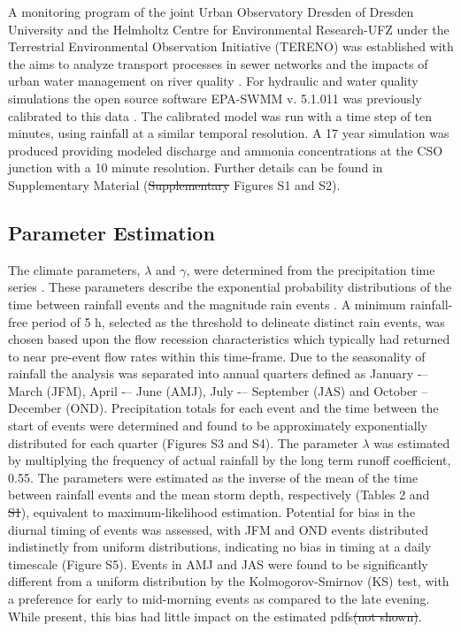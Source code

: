 \documentclass[draft,linenumbers]{agujournal2018}
\providecommand{\DIFadd}[1]{{\protect\color{blue}\uwave{#1}}} %
\providecommand{\DIFdel}[1]{{\protect\color{red}\sout{#1}}}                      %
\providecommand{\DIFaddbegin}{} %
\providecommand{\DIFaddend}{} %
\providecommand{\DIFdelbegin}{} %
\providecommand{\DIFdelend}{} %
\begin{document}
A monitoring program of the joint Urban Observatory Dresden of Dresden University and the Helmholtz Centre for Environmental Research-UFZ under the Terrestrial Environmental Observation Initiative (TERENO) was established with the aims to analyze transport processes in sewer networks and the impacts of urban water management on river quality \DIFdelbegin %
\DIFdelend \DIFaddbegin \citep{Helm2015, Wollschl_ger_2016}\DIFaddend . For hydraulic and water quality simulations the open source software EPA-SWMM v. 5.1.011 was previously calibrated to this data \DIFdelbegin %
\DIFdelend \DIFaddbegin \citep{Deb_2002,Kaeseberg_2018,Rossmann2010,steinberg2015}\DIFaddend . The calibrated model was run with a time step of ten minutes, using rainfall at a similar temporal resolution. A 17 year simulation was produced providing modeled discharge and ammonia concentrations at the CSO junction with a 10 minute resolution. Further details can be found in Supplementary Material (\DIFdelbegin \DIFdel{Supplementary }\DIFdelend \DIFaddbegin \DIFadd{Text S2, }\DIFaddend Figures S1 and S2).

\subsection{Parameter Estimation}
The climate parameters, $\lambda$ and $\gamma$, were determined from the precipitation time series \DIFaddbegin \DIFadd{(Supplementary Text S2, Table S2, Figures S3 - S5)}\DIFaddend . These parameters describe the exponential probability distributions of the time between rainfall events and the magnitude rain events \citep{Rodriguez_Iturbe_1999}. A minimum rainfall-free period of 5 h, selected as the threshold to delineate distinct rain events, was chosen based upon the f\/low recession characteristics which typically had returned to near pre-event f\/low rates within this time-frame. Due to the seasonality of rainfall the analysis was separated into annual quarters def\/ined as January -– March (JFM), April -– June (AMJ), July -– September (JAS) and October -- December (OND). Precipitation totals for each event and the time between the start of events were determined and found to be approximately exponentially distributed for each quarter (Figures S3 and S4). The parameter $\lambda$ was estimated by multiplying the frequency of actual rainfall by the long term runof\/f coef\/f\/icient, 0.55. The parameters were estimated as the inverse of the mean of the time between rainfall events and the mean storm depth, respectively (Tables 2 and \DIFdelbegin \DIFdel{S1}\DIFdelend \DIFaddbegin \DIFadd{S2}\DIFaddend ), equivalent to maximum-likelihood estimation. Potential for bias in the diurnal timing of events was assessed, with JFM and OND events distributed indistinctly from uniform distributions, indicating no bias in timing at a daily timescale (Figure S5). Events in AMJ and JAS were found to be signif\/icantly dif\/ferent from a uniform distribution by the Kolmogorov-Smirnov (KS) test, with a preference for early to mid-morning events as compared to the late evening. While present, this bias had little impact on the estimated pdfs\DIFdelbegin \DIFdel{(not shown)}\DIFdelend .
\end{document}

